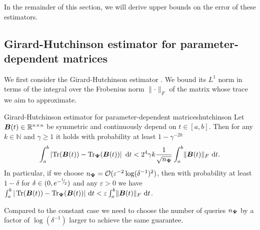 \documentclass[12pt]{article}
\begin{document}
In the remainder of this section, we will derive upper bounds on the error of these estimators.
%

\subsection{Girard-Hutchinson estimator for parameter-dependent matrices}
\label{subsec:hutchinson}

We first consider the Girard-Hutchinson estimator . We bound its $L^1$ norm in terms of the integral over the Frobenius norm $\lVert \cdot \rVert _F$ of the matrix whose trace we aim to approximate.

\begin{theorem}{Girard-Hutchinson estimator for parameter-dependent matrices}{hutchinson}
    Let $\boldsymbol{B}(t) \in \mathbb{R}^{n \times n}$ be symmetric and continuously depend on $t \in [a, b]$. Then for any $k \in \mathbb{N}$ and $\gamma \geq 1$ it holds with probability at least $1 - \gamma^{-2k}$
    \begin{equation}
        \int_{a}^{b} \left| \operatorname{Tr}(\boldsymbol{B}(t)) - \operatorname{Tr}_{\boldsymbol{\Psi}}(\boldsymbol{B}(t)) \right| ~\mathrm{d}t < 2^4 \gamma k \frac{1}{\sqrt{n_{\boldsymbol{\Psi}}}} \int_{a}^{b} \lVert \boldsymbol{B}(t) \rVert _F  ~\mathrm{d}t.
    \end{equation}
    In particular, if we choose $n_{\boldsymbol{\Psi}} = \mathcal{O}(\varepsilon^{-2} \log(\delta^{-1})^2)$, then with probability at least $1-\delta$ for $\delta \in (0, e^{- {}^{1}{\mskip -5mu/\mskip -3mu}_{2}})$ and any $\varepsilon > 0$ we have $\int_{a}^{b} | \operatorname{Tr}(\boldsymbol{B}(t)) - \operatorname{Tr}_{\boldsymbol{\Psi}}(\boldsymbol{B}(t)) | ~\mathrm{d}t < \varepsilon \int_{a}^{b} \lVert \boldsymbol{B}(t) \rVert _F~\mathrm{d}t$.
\end{theorem}

Compared to the constant case \cite[lemma 2.1]{meyer-2021-hutch-optimal} we need to choose the number of queries $n_{\boldsymbol{\Psi}}$ by a factor of $\log(\delta^{-1})$ larger to achieve the same guarantee.
\end{document}
